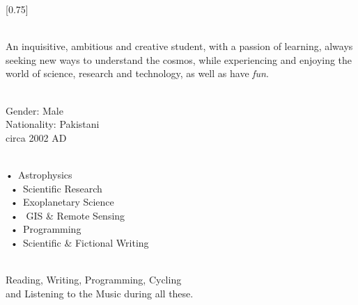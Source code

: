 \documentclass[lighthipster]{simplehipstercv}
\begin{document}
\setlength{\columnsep}{1.5cm}
[0.75]
\begin{paracol}{2}

\paracolbackgroundoptions



\footnotesize
{\setasidefontcolour
\flushright

\vspace{4.5em}
\\[0.5em]

{\footnotesize
An inquisitive, ambitious and creative student, with a passion of learning, always seeking new ways to 
understand the cosmos, while experiencing and enjoying the world of science, research and technology, as well as have \emph{fun}.
}
\bigskip


 \\[0.5em]
Gender: Male \\
Nationality: Pakistani \\
circa 2002 AD\\

\bigskip

 \\[0.5em]

•~Astrophysics \\~•~Scientific Research\\~•~Exoplanetary Science\\~•~ GIS \& Remote Sensing \\~•~Programming\\~•~Scientific \& Fictional Writing

\bigskip


\\[0.5em]

Reading, Writing, Programming, Cycling \\and Listening to the Music during all these.

\bigskip

\vspace{3em}

}
\end{paracol}
\end{document}
